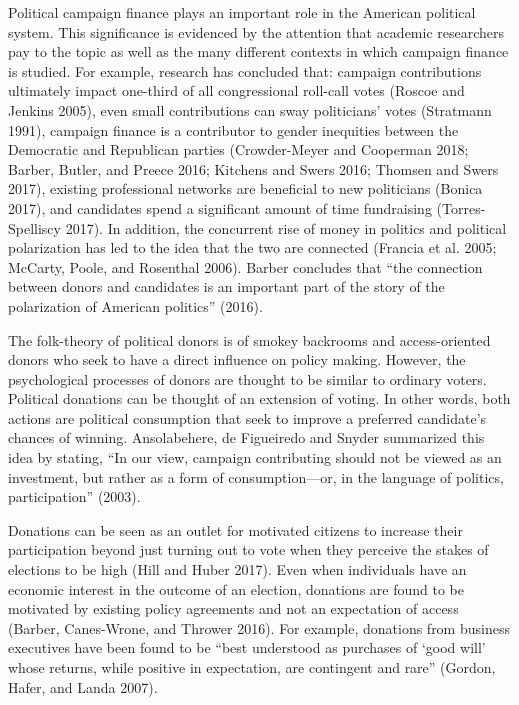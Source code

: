 \documentclass[12pt,]{article}
\begin{document}
\vskip -8.5pt



\noindent \doublespacing 

Political campaign finance plays an important role in the American
political system. This significance is evidenced by the attention that
academic researchers pay to the topic as well as the many different
contexts in which campaign finance is studied. For example, research has
concluded that: campaign contributions ultimately impact one-third of
all congressional roll-call votes (Roscoe and Jenkins 2005), even small
contributions can sway politicians' votes (Stratmann 1991), campaign
finance is a contributor to gender inequities between the Democratic and
Republican parties (Crowder-Meyer and Cooperman 2018; Barber, Butler,
and Preece 2016; Kitchens and Swers 2016; Thomsen and Swers 2017),
existing professional networks are beneficial to new politicians (Bonica
2017), and candidates spend a significant amount of time fundraising
(Torres-Spelliscy 2017). In addition, the concurrent rise of money in
politics and political polarization has led to the idea that the two are
connected (Francia et al. 2005; McCarty, Poole, and Rosenthal 2006).
Barber concludes that ``the connection between donors and candidates is
an important part of the story of the polarization of American
politics'' (2016).

The folk-theory of political donors is of smokey backrooms and
access-oriented donors who seek to have a direct influence on policy
making. However, the psychological processes of donors are thought to be
similar to ordinary voters. Political donations can be thought of an
extension of voting. In other words, both actions are political
consumption that seek to improve a preferred candidate's chances of
winning. Ansolabehere, de Figueiredo and Snyder summarized this idea by
stating, ``In our view, campaign contributing should not be viewed as an
investment, but rather as a form of consumption---or, in the language of
politics, participation'' (2003).

Donations can be seen as an outlet for motivated citizens to increase
their participation beyond just turning out to vote when they perceive
the stakes of elections to be high (Hill and Huber 2017). Even when
individuals have an economic interest in the outcome of an election,
donations are found to be motivated by existing policy agreements and
not an expectation of access (Barber, Canes-Wrone, and Thrower 2016).
For example, donations from business executives have been found to be
``best understood as purchases of `good will' whose returns, while
positive in expectation, are contingent and rare'' (Gordon, Hafer, and
Landa 2007).
\end{document}
